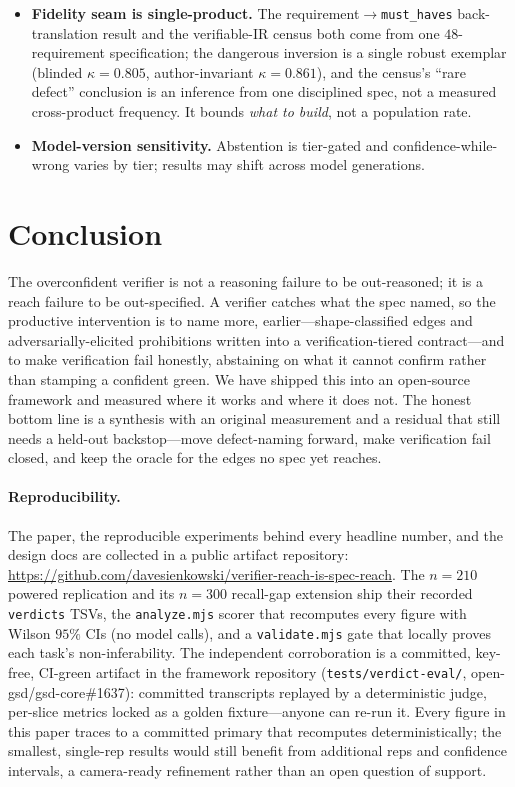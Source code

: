 \documentclass[11pt]{article}
\newcommand{\code}[1]{\texttt{#1}}
\begin{document}
\begin{itemize}[leftmargin=1.4em,itemsep=2pt]
subagent in these experiments was from a single model family.
\item \textbf{Fidelity seam is single-product.} The requirement$\to$\code{must\_haves} back-translation
result and the verifiable-IR census both come from one $48$-requirement specification; the dangerous
inversion is a single robust exemplar (blinded $\kappa=0.805$, author-invariant $\kappa=0.861$), and the
census's ``rare defect'' conclusion is an inference from one disciplined spec, not a measured
cross-product frequency. It bounds \emph{what to build}, not a population rate.
\item \textbf{Model-version sensitivity.} Abstention is tier-gated and confidence-while-wrong varies
by tier; results may shift across model generations.
\end{itemize}

\section{Conclusion}

The overconfident verifier is not a reasoning failure to be out-reasoned; it is a reach failure to be
out-specified. A verifier catches what the spec named, so the productive intervention is to name more,
earlier---shape-classified edges and adversarially-elicited prohibitions written into a
verification-tiered contract---and to make verification fail honestly, abstaining on what it cannot
confirm rather than stamping a confident green. We have shipped this into an open-source framework and
measured where it works and where it does not. The honest bottom line is a synthesis with an original
measurement and a residual that still needs a held-out backstop---move defect-naming forward, make
verification fail closed, and keep the oracle for the edges no spec yet reaches.

\paragraph{Reproducibility.} The paper, the reproducible experiments behind every headline number, and
the design docs are collected in a public artifact repository:
\url{https://github.com/davesienkowski/verifier-reach-is-spec-reach}. The
$n=210$ powered replication and its $n=300$ recall-gap extension ship their recorded \code{verdicts}
TSVs, the \code{analyze.mjs} scorer that recomputes every figure with Wilson $95\%$ CIs (no model
calls), and a \code{validate.mjs} gate that locally proves each task's non-inferability. The independent corroboration is a committed, key-free,
CI-green artifact in the framework repository (\code{tests/verdict-eval/}, open-gsd/gsd-core\#1637):
committed transcripts replayed by a deterministic judge, per-slice metrics locked as a golden
fixture---anyone can re-run it. Every figure in this paper traces to a committed primary that
recomputes deterministically; the smallest, single-rep results would still benefit from additional reps
and confidence intervals, a camera-ready refinement rather than an open question of support.
\end{document}

